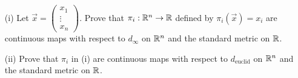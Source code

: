 \documentclass[a4paper]{article}
\begin{document}
\begin{problem}
    \begin{enumerate}
        \item[(i)] Let \( \vec{x} = \displaystyle \begin{pmatrix} {x}_{1} \\ \vdots \\ {x}_{n}  \end{pmatrix}  \). Prove that \( {\pi}_{i}: \mathbb{R}^{n} \to \mathbb{R}  \) defined by
            \(  {\pi}_{i}(\vec{ x } ) = {x}_{i} \)
            are continuous maps with respect to \( {d}_{\infty }  \) on \( \mathbb{R}^{n}  \) and the standard metric on \( \mathbb{R}  \).
        \item[(ii)] Prove that \( {\pi}_{i} \) in (i) are continuous maps with respect to \( {d}_{\text{euclid}} \) on \( \mathbb{R}^{n} \) and the standard metric on \( \mathbb{R}  \).
    \end{enumerate}
\end{problem}
\end{document}
